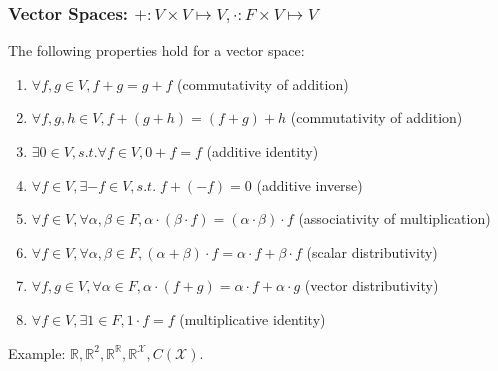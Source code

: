 \documentclass{beamer}
\def\cal{\mathcal}
\begin{document}
\begin{frame}
	\frametitle{Vector Spaces: $+: V \times V \mapsto V, \cdot: F \times V \mapsto V$}
	The following properties hold for a vector space:
	\begin{enumerate}
		\item $\forall f, g \in V, f + g = g + f$ (commutativity of addition)
		\item $\forall f, g, h \in V, f + (g + h) = (f+g) + h$ (commutativity of addition)
		\item $\exists 0 \in V, s.t. \forall f \in V, 0 + f = f$ (additive identity)
		\item $\forall f \in V, \exists -f \in V, s.t. \; f+(-f)=0$ (additive inverse)
		\item $\forall f \in V, \forall \alpha, \beta \in F, \alpha\cdot(\beta \cdot f) = (\alpha\cdot\beta)\cdot f$ (associativity of multiplication)
		\item $\forall f \in V, \forall \alpha, \beta \in F, (\alpha + \beta) \cdot f = \alpha \cdot f + \beta \cdot f$ (scalar distributivity)
		\item $\forall f, g \in V, \forall \alpha \in F, \alpha \cdot ( f+g) = \alpha \cdot f + \alpha \cdot g$ (vector distributivity)
		\item $\forall f \in V, \exists 1 \in F, 1 \cdot f = f$ (multiplicative identity)
	\end{enumerate}
	Example: $\mathbb{R}, \mathbb{R}^2, \mathbb{R}^{\mathbb{R}}, \mathbb{R}^{\cal X}, C(\cal{X})$.
\end{frame}

\end{document}
